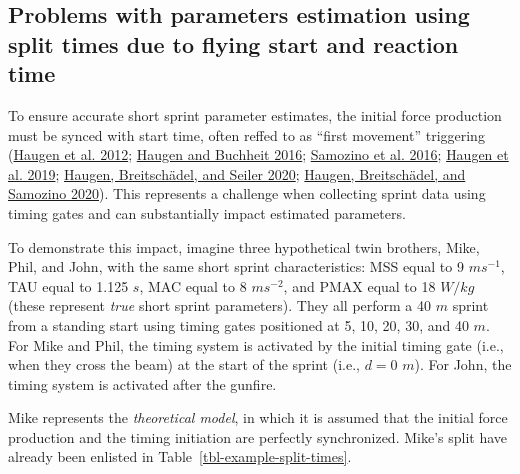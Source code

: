 \documentclass[
  letterpaper,
  DIV=11,
  numbers=noendperiod]{scrartcl}
\begin{document}
\hypertarget{problems-with-parameters-estimation-using-split-times-due-to-flying-start-and-reaction-time}{%
\subsection{Problems with parameters estimation using split times due to
flying start and reaction
time}\label{problems-with-parameters-estimation-using-split-times-due-to-flying-start-and-reaction-time}}

To ensure accurate short sprint parameter estimates, the initial force
production must be synced with start time, often reffed to as ``first
movement'' triggering
(\protect\hyperlink{ref-haugenDifferenceStartImpact2012}{Haugen et al.
2012}; \protect\hyperlink{ref-haugenSprintRunningPerformance2016}{Haugen
and Buchheit 2016};
\protect\hyperlink{ref-samozinoSimpleMethodMeasuring2016}{Samozino et
al. 2016};
\protect\hyperlink{ref-haugenSprintMechanicalVariables2019}{Haugen et
al. 2019};
\protect\hyperlink{ref-haugenSprintMechanicalProperties2020}{Haugen,
Breitschädel, and Seiler 2020};
\protect\hyperlink{ref-haugenPowerForceVelocityProfilingSprinting2020}{Haugen,
Breitschädel, and Samozino 2020}). This represents a challenge when
collecting sprint data using timing gates and can substantially impact
estimated parameters.

To demonstrate this impact, imagine three hypothetical twin brothers,
Mike, Phil, and John, with the same short sprint characteristics: MSS
equal to 9 \(ms^{-1}\), TAU equal to 1.125 \(s\), MAC equal to 8
\(ms^{-2}\), and PMAX equal to 18 \(W/kg\) (these represent \emph{true}
short sprint parameters). They all perform a 40 \(m\) sprint from a
standing start using timing gates positioned at 5, 10, 20, 30, and 40
\(m\). For Mike and Phil, the timing system is activated by the initial
timing gate (i.e., when they cross the beam) at the start of the sprint
(i.e., \(d=0\) \(m\)). For John, the timing system is activated after
the gunfire.

Mike represents the \emph{theoretical model}, in which it is assumed
that the initial force production and the timing initiation are
perfectly synchronized. Mike's split have already been enlisted in
Table~\ref{tbl-example-split-times}.
\end{document}
